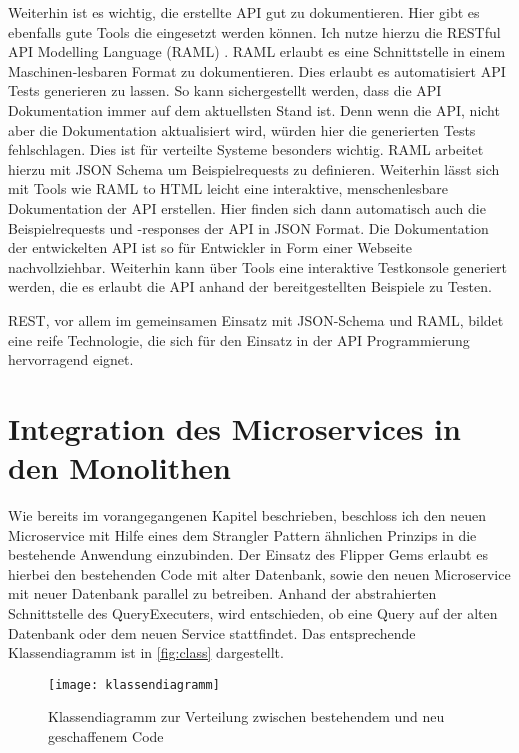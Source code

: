 Weiterhin ist es wichtig, die erstellte API gut zu dokumentieren. Hier gibt es ebenfalls gute Tools die eingesetzt werden können. Ich nutze hierzu die RESTful API Modelling Language (RAML) \cite{raml}. RAML erlaubt es eine Schnittstelle in einem Maschinen-lesbaren Format zu dokumentieren. Dies erlaubt es automatisiert API Tests generieren zu lassen. So kann sichergestellt werden, dass die API Dokumentation immer auf dem aktuellsten Stand ist. Denn wenn die API, nicht aber die Dokumentation aktualisiert wird, würden hier die generierten Tests fehlschlagen. Dies ist für verteilte Systeme besonders wichtig. RAML arbeitet hierzu mit JSON Schema um Beispielrequests zu definieren. Weiterhin lässt sich mit Tools wie RAML to HTML \cite{raml2html} leicht eine interaktive, menschenlesbare Dokumentation der API erstellen. Hier finden sich dann automatisch auch die Beispielrequests und -responses der API in JSON Format. Die Dokumentation der entwickelten API ist so für Entwickler in Form einer Webseite \cite{prophetdoku} nachvollziehbar. 
Weiterhin kann über Tools \cite{ramlconsoletool} eine interaktive Testkonsole generiert werden, die es erlaubt die API anhand der bereitgestellten Beispiele zu Testen.

REST, vor allem im gemeinsamen Einsatz mit JSON-Schema und RAML, bildet eine reife Technologie, die sich für den Einsatz in der API Programmierung hervorragend eignet.


\section{Integration des Microservices in den Monolithen}
Wie bereits im vorangegangenen Kapitel beschrieben, beschloss ich den neuen Microservice mit Hilfe eines dem Strangler Pattern ähnlichen Prinzips in die bestehende Anwendung einzubinden.
Der Einsatz des Flipper Gems erlaubt es hierbei den bestehenden Code mit alter Datenbank, sowie den neuen Microservice mit neuer Datenbank parallel zu betreiben. Anhand der abstrahierten Schnittstelle des QueryExecuters, wird entschieden, ob eine Query auf der alten Datenbank oder dem neuen Service stattfindet. Das entsprechende Klassendiagramm ist in \autoref{fig:class} dargestellt.
\begin{figure}[!ht]
    \centering
    \caption{Klassendiagramm zur Verteilung zwischen bestehendem und neu geschaffenem Code}
    \label{fig:class}
    \texttt{[image: klassendiagramm]}
\end{figure}

